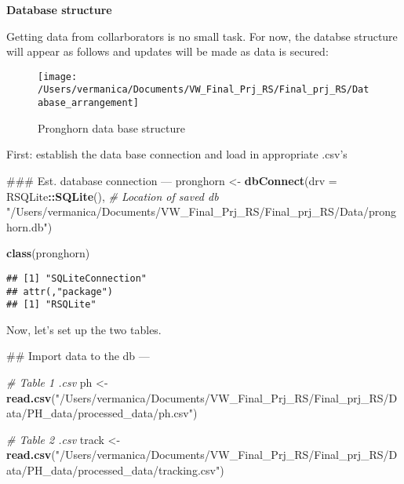 \documentclass[]{book}
\newenvironment{Shaded}{\begin{snugshade}}{\end{snugshade}}
\newcommand{\KeywordTok}[1]{\textcolor[rgb]{0.13,0.29,0.53}{\textbf{#1}}}
\newcommand{\DataTypeTok}[1]{\textcolor[rgb]{0.13,0.29,0.53}{#1}}
\newcommand{\StringTok}[1]{\textcolor[rgb]{0.31,0.60,0.02}{#1}}
\newcommand{\CommentTok}[1]{\textcolor[rgb]{0.56,0.35,0.01}{\textit{#1}}}
\newcommand{\OperatorTok}[1]{\textcolor[rgb]{0.81,0.36,0.00}{\textbf{#1}}}
\newcommand{\NormalTok}[1]{#1}
\begin{document}
\textbf{Database structure}

Getting data from collarborators is no small task. For now, the databse
structure will appear as follows and updates will be made as data is
secured:

\begin{figure}

{\centering \texttt{[image: /Users/vermanica/Documents/VW\_Final\_Prj\_RS/Final\_prj\_RS/Database\_arrangement]} 

}

\caption{Pronghorn data base structure}\label{fig:logo}
\end{figure}

First: establish the data base connection and load in appropriate .csv's

\begin{Shaded}
\begin{Highlighting}[]
\NormalTok{### Est. database connection ---}
\NormalTok{pronghorn <-}\StringTok{ }\KeywordTok{dbConnect}\NormalTok{(}\DataTypeTok{drv =}\NormalTok{ RSQLite}\OperatorTok{::}\KeywordTok{SQLite}\NormalTok{(), }\CommentTok{# Location of saved db}
  \StringTok{"/Users/vermanica/Documents/VW_Final_Prj_RS/Final_prj_RS/Data/pronghorn.db"}\NormalTok{)}

\KeywordTok{class}\NormalTok{(pronghorn)}
\end{Highlighting}
\end{Shaded}

\begin{verbatim}
## [1] "SQLiteConnection"
## attr(,"package")
## [1] "RSQLite"
\end{verbatim}

Now, let's set up the two tables.

\begin{Shaded}
\begin{Highlighting}[]
\NormalTok{## Import data to the db ---}

\CommentTok{# Table 1 .csv}
\NormalTok{ph <-}\StringTok{ }\KeywordTok{read.csv}\NormalTok{(}\StringTok{"/Users/vermanica/Documents/VW_Final_Prj_RS/Final_prj_RS/Data/PH_data/processed_data/ph.csv"}\NormalTok{)}

\CommentTok{# Table 2 .csv}
\NormalTok{track <-}\StringTok{ }\KeywordTok{read.csv}\NormalTok{(}\StringTok{"/Users/vermanica/Documents/VW_Final_Prj_RS/Final_prj_RS/Data/PH_data/processed_data/tracking.csv"}\NormalTok{)}
\end{Highlighting}
\end{Shaded}
\end{document}
